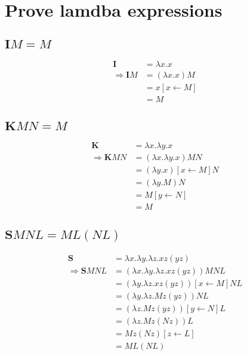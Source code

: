 \section{Prove lamdba expressions}
\subsection{$\textbf{I} M = M$}
\begin{align}
							\textbf{I}	&= \lambda x. x \\
\Rightarrow	\textbf{I} M	&= (\lambda x. x) M \\
													&= x [x \leftarrow M] \\
													&= M
\end{align}

\subsection{$\textbf{K} M N = M$}
\begin{align}
								 \textbf{K} &= \lambda x. \lambda y. x \\
\Rightarrow	\textbf{K} M	N &= (\lambda x. \lambda y. x) M N \\
														&= (\lambda y. x) [x \leftarrow M] N \\
														&= (\lambda y. M) N \\
														&= M [y \leftarrow N] \\
														&= M
\end{align}

\subsection{$\textbf{S} M N L = M L ( N L )$}
\begin{align}
									 \textbf{S}	&= \lambda x. \lambda y. \lambda z. x z ( y z ) \\
\Rightarrow	\textbf{S} M	N L	&= (\lambda x. \lambda y. \lambda z. x z ( y z )) M N L \\
															&= (\lambda y. \lambda z. x z ( y z )) [x \leftarrow M] N L \\
															&= (\lambda y. \lambda z. M z ( y z )) N L \\
															&= (\lambda z. M z ( y z )) [y \leftarrow N] L \\
															&= (\lambda z. M z ( N z )) L \\
															&= M z ( N z ) [z \leftarrow L] \\
															&= M L ( N L )
\end{align}